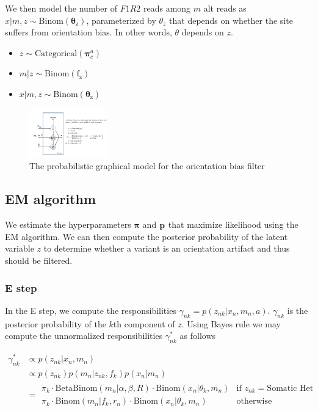 \documentclass[a4paper]{article}
\newcommand{\vp}{{\bf p}}
\newcommand{\vpi}{{\bm \pi}}
\newcommand{\vtheta}{{\bm \theta}}
\begin{document}
We then model the number of $F1R2$ reads among $m$ alt reads as $x|m,z \sim \mathrm{Binom(\vtheta_z)}$, parameterized by $\theta_z$ that depends on whether the site suffers from orientation bias. In other words, $\theta$ depends on $z$. 

\begin{itemize}
\item $z \sim \mathrm{Categorical}(\vpi^a_c)$
\item $m | z \sim \mathrm{Binom(f_z)}$
\item $x | m,z \sim \mathrm{Binom(\vtheta_z)}$
\end{itemize}

\begin{figure}
\centering
\includegraphics[width=0.3\textwidth]{pgm.png}
\caption{\label{fig:pgm} The probabilistic graphical model for the orientation bias filter}
\end{figure}


\subsection{EM algorithm}
We estimate the hyperparameters $\vpi$ and $\vp$ that maximize likelihood using the EM algorithm. We can then compute the posterior probability of the latent variable $z$ to determine whether a variant is an orientation artifact and thus should be filtered.

\subsubsection{E step}
In the E step, we compute the responsibilities $\gamma_{nk} = p(z_{nk} | x_n, m_n, a)$. $\gamma_{nk}$ is the posterior probability of the $k$th component of $z$. Using Bayes rule we may compute the unnormalized responsibilities $\gamma^*_{nk}$ as follows

\begin{align}
\gamma^*_{nk}  &\propto p(z_{nk} | x_n, m_n) \nonumber \\
		        &\propto p(z_{nk}) p(m_n | z_{nk}, f_{k} ) p(x_n | m_n ) \nonumber \\
		        &=  \begin{array}{ll}
        				\pi_{k} \cdot \mathrm{BetaBinom}(m_n | \alpha, \beta, R) \cdot \mathrm{Binom}(x_n | \theta_k, m_n) 	&\text{if } z_{nk} = \text{Somatic Het} \\
			        \pi_{k} \cdot \mathrm{Binom}(m_n | f_k, r_n) \cdot \mathrm{Binom}(x_n | \theta_k, m_n) 	&\text{otherwise}
			     \end{array}
\end{align}
\end{document}
